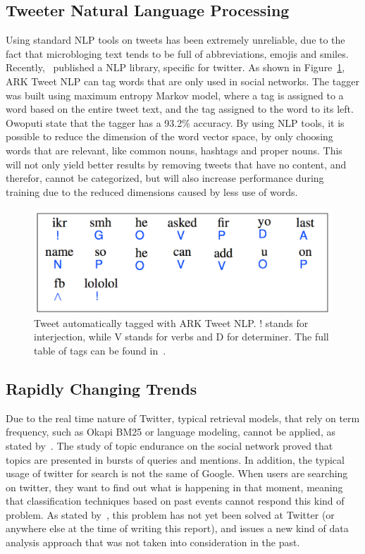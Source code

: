 \subsection{Tweeter Natural Language Processing}
\label{sub:tweeter_natural_language_processing}
Using standard \ac{NLP} tools on tweets has been extremely unreliable, due to the fact that microbloging text tends to be full of abbreviations, emojis and smiles. Recently,~\citet{owoputi13improvedparth} published a \ac{NLP} library, specific for twitter. As shown in Figure~\ref{fig:nlp}, ARK Tweet \ac{NLP} can tag words that are only used in social networks. The tagger was built using maximum entropy Markov model, where a tag is assigned to a word based on the entire tweet text, and the tag assigned to the word to its left. Owoputi state that the tagger has a 93.2\% accuracy. 
By using \ac{NLP} tools, it is possible to reduce the dimension of the word vector space, by only choosing words that are relevant, like common nouns, hashtags and proper nouns. This will not only yield better results by removing tweets that have no content, and therefor, cannot be categorized, but will also increase performance during training due to the reduced dimensions caused by less use of words.
\begin{figure}[htpb]
  \centering
  \includegraphics[width=0.6\linewidth]{./images/nlp.pdf}
  \caption{Tweet automatically tagged with ARK Tweet NLP. ! stands for interjection, while V stands for verbs and D for determiner. The full table of tags can be found in~\cite{owoputi13improvedparth}.}
  \label{fig:nlp}
\end{figure}

\subsection{Rapidly Changing Trends} 
\label{sub:real_time_}
Due to the real time nature of Twitter, typical retrieval models, that rely on term frequency, such as Okapi BM25 or language modeling, cannot be applied, as stated by~\citet{Lin2012}. The study of topic endurance on the social network proved that topics are presented in bursts of queries and mentions. In addition, the typical usage of twitter for search is not the same of Google. When users are searching on twitter, they want to find out what is happening in that moment, meaning that classification techniques based on past events cannot respond this kind of problem. As stated by~\citet{Lin2012}, this problem has not yet been solved at Twitter (or anywhere else at the time of writing this report), and issues a new kind of data analysis approach that was not taken into consideration in the past. 

